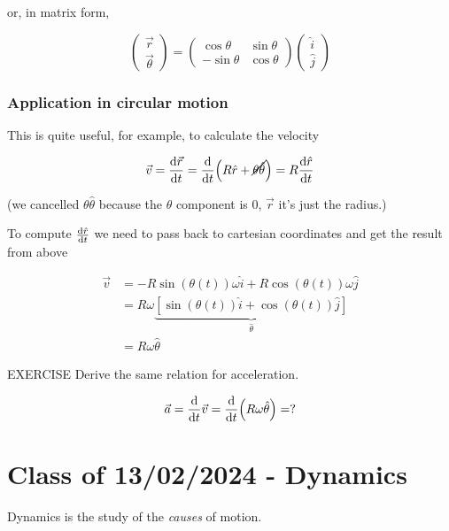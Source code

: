 \documentclass[14pt]{extarticle}
\begin{document}
or, in matrix form,

$$
  \begin{pmatrix}
    \vec r \\
    \vec \theta
  \end{pmatrix}
  =
  \begin{pmatrix}
    \cos \theta  & \sin \theta \\
    -\sin \theta & \cos \theta
  \end{pmatrix}
  \begin{pmatrix}
    \hat i \\
    \hat j
  \end{pmatrix}
$$

\subsubsection{Application in circular motion}

This is quite useful, for example, to calculate the velocity

$$
  \vec v = \dv {\vec r}{t} = \dv{t} (R \hat r + \cancel{\theta \hat \theta})
  = R \dv{\hat r}{t}
$$

(we cancelled $\theta \hat \theta$ because the $\theta$ component is 0, $\vec r$ it's just the radius.)

To compute $\dv{\hat r}{t}$ we need to pass back to cartesian coordinates and get the result from above

\begin{align*}
  \vec{v} & = - R \sin (\theta(t)) \omega \hat i + R \cos (\theta(t)) \omega \hat j                   \\
          & = R \omega \underbrace{[\sin (\theta(t)) \hat i + \cos (\theta(t)) \hat j]}_{\hat \theta} \\
          & = R \omega \hat \theta
\end{align*}

\begin{bluebox}{EXERCISE}
  Derive the same relation for acceleration.

  $$
    \vec{a} = \dv {t} \vec v = \dv{t}(R \omega \hat \theta) = ?
  $$
\end{bluebox}

\section{Class of 13/02/2024 - Dynamics}

Dynamics is the study of the \textit{causes} of motion.
\end{document}
